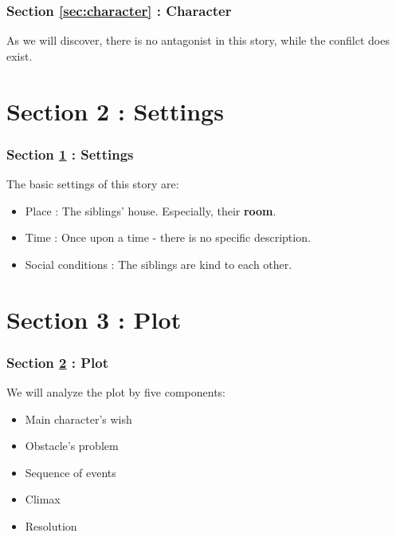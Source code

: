 \documentclass{beamer}
\begin{document}
	\begin{frame}
		\frametitle{Section \ref{sec:character} : Character}
		As we will discover, there is no {\color{cyan} antagonist} in this story, while the confilct does exist.
	\end{frame}
	
	\section{Section 2 : Settings}\label{sec:settings}
	\begin{frame}
		\frametitle{Section \ref{sec:settings} : Settings}
		The basic settings of this story are:
		\begin{itemize}
			\item Place : The siblings' house. Especially, their {\bf room}.
			\item Time : Once upon a time - there is no specific description.
			\item Social conditions : The siblings are kind to each other.
		\end{itemize}
	\end{frame}
	
	\section{Section 3 : Plot}\label{sec:plot}
	\begin{frame}
		\frametitle{Section \ref{sec:plot} : Plot}
		We will analyze the plot by five components:
		\begin{itemize}
			\item Main character's wish
			\item Obstacle's problem
			\item Sequence of events
			\item Climax
			\item Resolution
		\end{itemize}
	\end{frame}
	
\end{document}
